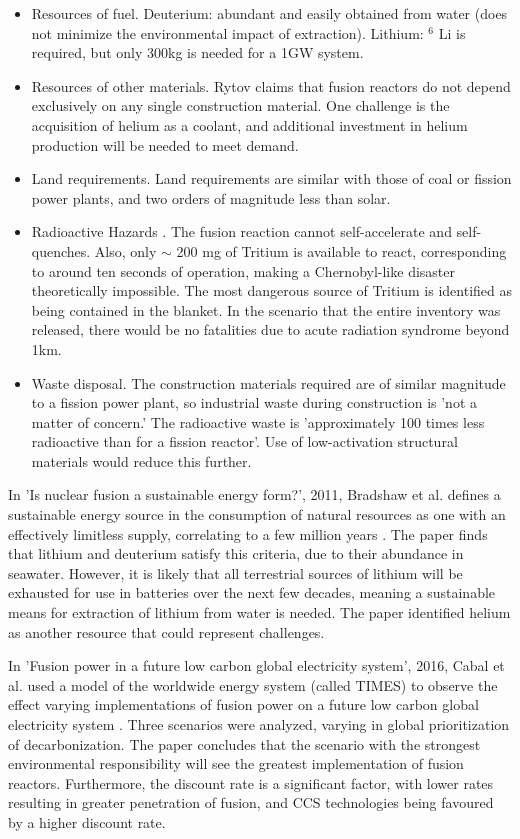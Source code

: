 \begin{itemize}
    \item Resources of fuel. Deuterium: abundant and easily obtained from water (does not minimize the environmental impact of extraction). Lithium: $^6$ Li is required, but only 300kg is needed for a 1GW system.
    \item Resources of other materials. Rytov claims that fusion reactors do not depend exclusively on any single construction material. One challenge is the acquisition of helium as a coolant, and additional investment in helium production will be needed to meet demand.
    \item Land requirements. Land requirements are similar with those of coal or fission power plants, and two orders of magnitude less than solar.
    \item Radioactive Hazards . The fusion reaction cannot self-accelerate and self-quenches. Also, only $\sim$ 200 mg of Tritium is available to react, corresponding to around ten seconds of operation, making a Chernobyl-like disaster theoretically impossible. The most dangerous source of Tritium is identified as being contained in the blanket. In the scenario that the entire inventory was released, there would be no fatalities due to acute radiation syndrome beyond 1km.
    \item Waste disposal. The construction materials required are of similar magnitude to a fission power plant, so industrial waste during construction is 'not a matter of concern.' The radioactive waste is 'approximately 100 times less radioactive than for a fission reactor'. Use of low-activation structural materials would reduce this further.
\end{itemize}

In 'Is nuclear fusion a sustainable energy form?', 2011, Bradshaw et al. defines a sustainable energy source in the consumption of natural resources as one with an effectively limitless supply, correlating to a few million years \cite{bradshaw2011nuclear}. The paper finds that lithium and deuterium satisfy this criteria, due to their abundance in seawater. However, it is likely that all terrestrial sources of lithium will be exhausted for use in batteries over the next few decades, meaning a sustainable means for extraction of lithium from water is needed. The paper identified helium as another resource that could represent challenges.

In 'Fusion power in a future low carbon global electricity system', 2016, Cabal et al. used a model of the worldwide energy system (called TIMES) to observe the effect varying implementations of fusion power on a future low carbon global electricity system \cite{cabal2017fusion}. Three scenarios were analyzed, varying in global prioritization of decarbonization. The paper concludes that the scenario with the strongest environmental responsibility will see the greatest implementation of fusion reactors. Furthermore, the discount rate is a significant factor, with lower rates resulting in greater penetration of fusion, and CCS technologies being favoured by a higher discount rate.

